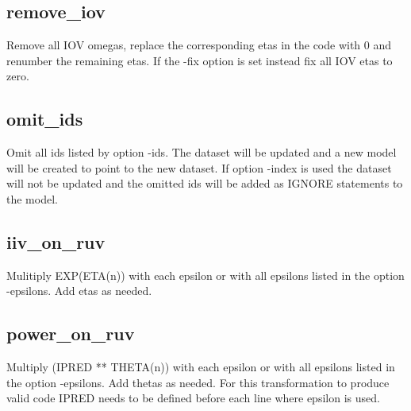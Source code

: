 \subsection{remove\_iov}
Remove all IOV omegas, replace the corresponding etas in the code with 0 and renumber the remaining etas. If the -fix option is set instead fix all IOV etas to zero.

\subsection{omit\_ids}
Omit all ids listed by option -ids. The dataset will be updated and a new model will be created to point to the new dataset. If option -index is used the dataset will not be updated and the omitted ids will be added as IGNORE statements to the model.

\subsection{iiv\_on\_ruv}
Mulitiply EXP(ETA(n)) with each epsilon or with all epsilons listed in the option -epsilons. Add etas as needed.

\subsection{power\_on\_ruv}
Multiply (IPRED ** THETA(n)) with each epsilon or with all epsilons listed in the option -epsilons. Add thetas as needed. For this transformation to produce valid code IPRED needs to be defined before each line where epsilon is used.


